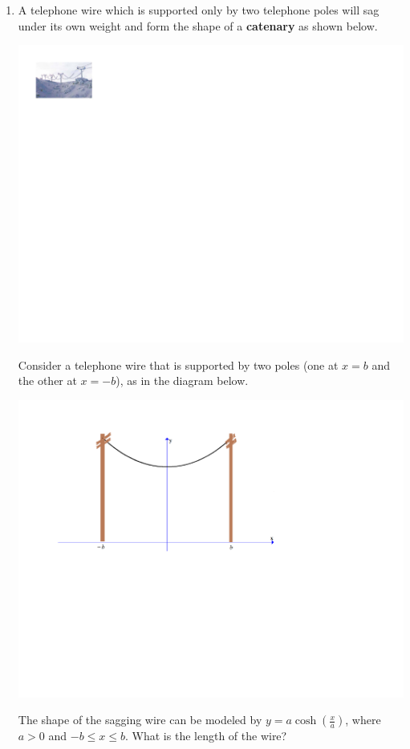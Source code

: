 \documentclass[12pt]{article}
\newif\ifans
\begin{document}
\begin{enumerate}
\begin{enumerate}
\item A telephone wire which is supported only by two telephone poles will sag under its own weight and form the shape of a {\bf catenary} as shown below.

\begin{center}
\includegraphics[scale=1]{catenary.pdf}
\end{center}

Consider a telephone wire that is supported by two poles (one at $x=b$ and the other at $x=-b$), as in the diagram below.

\begin{center}
\includegraphics[scale=0.6]{catenary2.pdf}
\end{center}

The shape of the sagging wire can be modeled by $y=a\cosh{\left(\frac{x}{a}\right)}$, where $a>0$ and $-b \leq x \leq b$.  What is the length of the wire?

\ifans{\fbox{$A=2a\sinh{\left(\frac{b}{a}\right)}$}} \fi

\end{enumerate}

\end{enumerate}
\end{document}
